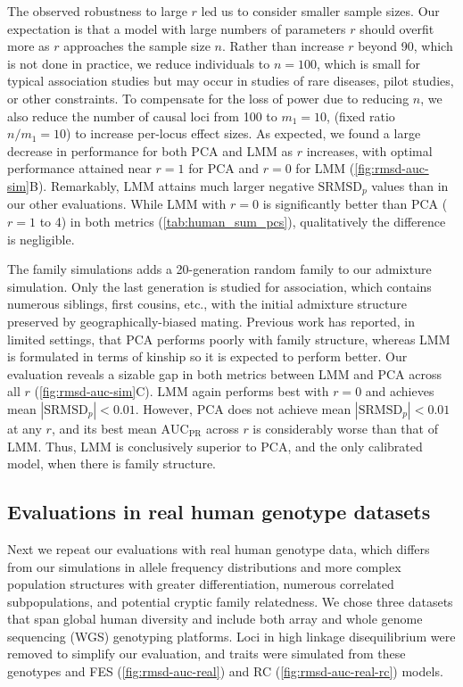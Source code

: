 \documentclass[11pt]{article}
\newcommand{\rmsd}{\text{SRMSD}_p}
\newcommand{\auc}{\text{AUC}_\text{PR}}
\begin{document}
The observed robustness to large $r$ led us to consider smaller sample sizes.
Our expectation is that a model with large numbers of parameters $r$ should overfit more as $r$ approaches the sample size $n$.
Rather than increase $r$ beyond 90, which is not done in practice, we reduce individuals to $n = 100$, which is small for typical association studies but may occur in studies of rare diseases, pilot studies, or other constraints.
To compensate for the loss of power due to reducing $n$, we also reduce the number of causal loci from 100 to $m_1 = 10$, (fixed ratio $n / m_1 = 10$) to increase per-locus effect sizes.
As expected, we found a large decrease in performance for both PCA and LMM as $r$ increases, with optimal performance attained near $r=1$ for PCA and $r=0$ for LMM (\cref{fig:rmsd-auc-sim}B).
Remarkably, LMM attains much larger negative $\rmsd$ values than in our other evaluations.
While LMM with $r=0$ is significantly better than PCA ($r=1$ to 4) in both metrics (\cref{tab:human_sum_pcs}), qualitatively the difference is negligible.

The family simulations adds a 20-generation random family to our admixture simulation.
Only the last generation is studied for association, which contains numerous siblings, first cousins, etc., with the initial admixture structure preserved by geographically-biased mating.
Previous work has reported, in limited settings, that PCA performs poorly with family structure, whereas LMM is formulated in terms of kinship so it is expected to perform better.
Our evaluation reveals a sizable gap in both metrics between LMM and PCA across all $r$ (\cref{fig:rmsd-auc-sim}C).
LMM again performs best with $r=0$ and achieves mean $|\rmsd| < 0.01$.
However, PCA does not achieve mean $|\rmsd| < 0.01$ at any $r$, and its best mean $\auc$ across $r$ is considerably worse than that of LMM.
Thus, LMM is conclusively superior to PCA, and the only calibrated model, when there is family structure.

\subsection{Evaluations in real human genotype datasets}

Next we repeat our evaluations with real human genotype data, which differs from our simulations in allele frequency distributions and more complex population structures with greater differentiation, numerous correlated subpopulations, and potential cryptic family relatedness.
We chose three datasets that span global human diversity and include both array and whole genome sequencing (WGS) genotyping platforms.
Loci in high linkage disequilibrium were removed to simplify our evaluation, and traits were simulated from these genotypes and FES (\cref{fig:rmsd-auc-real}) and RC (\cref{fig:rmsd-auc-real-rc}) models.
\end{document}
